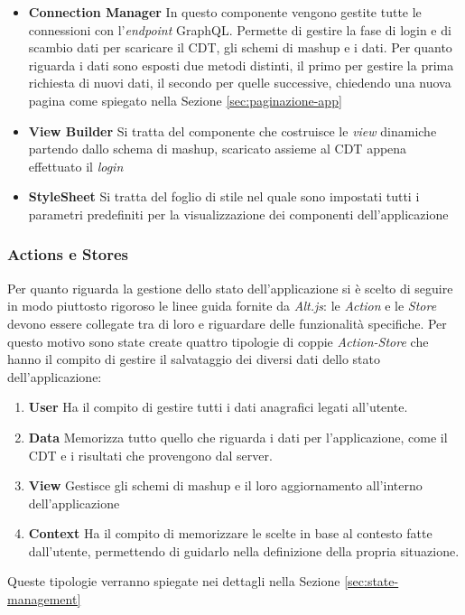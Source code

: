 \begin{itemize}
	\item \textbf{Connection Manager}
	In questo componente vengono gestite tutte le connessioni con l'\emph{endpoint} GraphQL. Permette di gestire la fase di login e di scambio dati per scaricare il CDT, gli schemi di mashup e i dati. Per quanto riguarda i dati sono esposti due metodi distinti, il primo per gestire la prima richiesta di nuovi dati, il secondo per quelle successive, chiedendo una nuova pagina come spiegato nella Sezione \ref{sec:paginazione-app}
	\item \textbf{View Builder}
	Si tratta del componente che costruisce le \emph{view} dinamiche partendo dallo schema di mashup, scaricato assieme al CDT appena effettuato il \emph{login}	
	\item \textbf{StyleSheet}
	Si tratta del foglio di stile nel quale sono impostati tutti i parametri predefiniti per la visualizzazione dei componenti dell'applicazione
\end{itemize}

\subsubsection{Actions e Stores}
Per quanto riguarda la gestione dello stato dell'applicazione si è scelto di seguire in modo piuttosto rigoroso le linee guida fornite da \emph{Alt.js}: le \emph{Action} e le \emph{Store} devono essere collegate tra di loro e riguardare delle funzionalità specifiche.
Per questo motivo sono state create quattro tipologie di coppie \emph{Action-Store} che hanno il compito di gestire il salvataggio dei diversi dati dello stato dell'applicazione: 
\begin{enumerate}
	\item \textbf{User} Ha il compito di gestire tutti i dati anagrafici legati all'utente.
	\item \textbf{Data} Memorizza tutto quello che riguarda i dati per l'applicazione, come il CDT e i risultati che provengono dal server.
	\item \textbf{View} Gestisce gli schemi di mashup e il loro aggiornamento all'interno dell'applicazione
	\item \textbf{Context} Ha il compito di memorizzare le scelte in base al contesto fatte dall'utente, permettendo di guidarlo nella definizione della propria situazione.
\end{enumerate}

Queste tipologie verranno spiegate nei dettagli nella Sezione \ref{sec:state-management}

